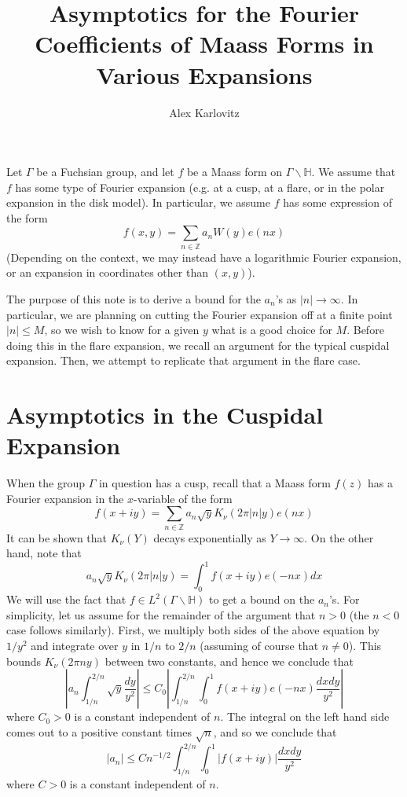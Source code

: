 \documentclass[]{article}
\title{Asymptotics for the Fourier Coefficients of Maass Forms in Various Expansions}
\author{Alex Karlovitz}
\date{}
\begin{document}
	
	\maketitle

Let $\Gamma$ be a Fuchsian group, and let $f$ be a Maass form on $\Gamma\backslash\mathbb{H}$.
We assume that $f$ has some type of Fourier expansion (e.g. at a cusp, at a flare, or in the polar expansion in the disk model).
In particular, we assume $f$ has some expression of the form
$$
	f(x, y) = \sum_{n \in \mathbb{Z}}a_nW(y)e(nx)
$$
(Depending on the context, we may instead have a logarithmic Fourier expansion, or an expansion in coordinates other than $(x, y)$).

The purpose of this note is to derive a bound for the $a_n$'s as $|n| \rightarrow \infty$.
In particular, we are planning on cutting the Fourier expansion off at a finite point $|n| \leq M$, so we wish to know for a given $y$ what is a good choice for $M$.
Before doing this in the flare expansion, we recall an argument for the typical cuspidal expansion.
Then, we attempt to replicate that argument in the flare case.
	
\section*{Asymptotics in the Cuspidal Expansion}

When the group $\Gamma$ in question has a cusp, recall that a Maass form $f(z)$ has a Fourier expansion in the $x$-variable of the form
\begin{equation}\label{cuspExp}
f(x + iy) = \sum_{n\in\mathbb{Z}}a_n\sqrt{y}K_\nu(2\pi|n|y)e(nx)
\end{equation}
It can be shown that $K_\nu(Y)$ decays exponentially as $Y \rightarrow \infty$.
On the other hand, note that
$$
a_n\sqrt{y}K_\nu(2\pi|n|y) = \int_{0}^{1}f(x + iy)e(-nx)dx
$$
We will use the fact that $f \in L^2(\Gamma\backslash\mathbb{H})$ to get a bound on the $a_n$'s.
For simplicity, let us assume for the remainder of the argument that $n > 0$ (the $n < 0$ case follows similarly).
First, we multiply both sides of the above equation by $1/y^2$ and integrate over $y$ in $1/n$ to $2/n$ (assuming of course that $n \neq 0$).
This bounds $K_{\nu}(2\pi ny)$ between two constants, and hence we conclude that
$$
\left|a_n\int_{1/n}^{2/n}\sqrt{y}\frac{dy}{y^2}\right| \leq C_0\left|\int_{1/n}^{2/n}\int_{0}^{1}f(x+iy)e(-nx)\frac{dxdy}{y^2}\right|
$$
where $C_0 > 0$ is a constant independent of $n$.
The integral on the left hand side comes out to a positive constant times $\sqrt{n}$, and so we conclude that
\begin{equation}\label{firstCuspBound}
	|a_n| \leq
	Cn^{-1/2}\int_{1/n}^{2/n}\int_{0}^{1}|f(x+iy)|\frac{dxdy}{y^2}
\end{equation}
where $C > 0$ is a constant independent of $n$.
\\
\end{document}
